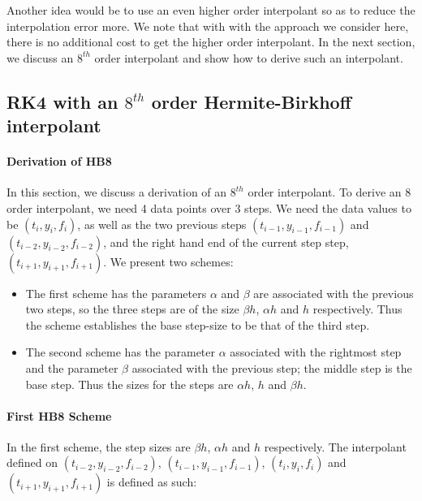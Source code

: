 Another idea would be to use an even higher order interpolant so as to reduce the interpolation error more. We note that with with the approach we consider here, there is no additional cost to get the higher order interpolant. In the next section, we discuss an $8^{th}$ order interpolant and show how to derive such an interpolant.

\subsection{RK4 with an $8^{th}$ order Hermite-Birkhoff interpolant}
\paragraph{Derivation of HB8}
In this section, we discuss a derivation of an $8^{th}$ order interpolant. To derive an 8 order interpolant, we need 4 data points over 3 steps. We need the data values to be $(t_i, y_i, f_i)$, as well as the two previous steps $(t_{i-1}, y_{i-1}, f_{i-1})$ and $(t_{i-2}, y_{i-2}, f_{i-2})$, and the right hand end of the current step step, $(t_{i+1}, y_{i+1}, f_{i+1})$. We present two schemes: 
\begin{itemize}
\item The first scheme has the parameters $\alpha$ and $\beta$ are associated with the previous two steps, so the three steps are of the size $\beta h$, $\alpha h$ and $h$ respectively. Thus the scheme establishes the base step-size to be that of the third step. 

\item The second scheme has the parameter $\alpha$ associated with the rightmost step and the parameter $\beta$ associated with the previous step; the middle step is the base step. Thus the sizes for the steps are $\alpha h$, $h$ and $\beta h$. 

\end{itemize}


\paragraph{First HB8 Scheme}
In the first scheme, the step sizes are $\beta h$, $\alpha h$ and $h$ respectively. The interpolant defined on $(t_{i-2}, y_{i-2}, f_{i-2})$, $(t_{i-1}, y_{i-1}, f_{i-1})$, $(t_i, y_i, f_i)$ and $(t_{i + 1}, y_{i + 1}, f_{i + 1})$ is defined as such:

